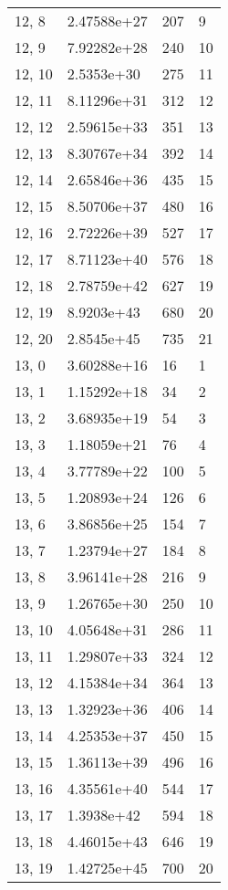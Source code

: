 \begin{table}
\begin{tabular}{llll}
12, 8  &  2.47588e+27 &  207 &     9 \\
12, 9  &  7.92282e+28 &  240 &    10 \\
12, 10 &   2.5353e+30 &  275 &    11 \\
12, 11 &  8.11296e+31 &  312 &    12 \\
12, 12 &  2.59615e+33 &  351 &    13 \\
12, 13 &  8.30767e+34 &  392 &    14 \\
12, 14 &  2.65846e+36 &  435 &    15 \\
12, 15 &  8.50706e+37 &  480 &    16 \\
12, 16 &  2.72226e+39 &  527 &    17 \\
12, 17 &  8.71123e+40 &  576 &    18 \\
12, 18 &  2.78759e+42 &  627 &    19 \\
12, 19 &   8.9203e+43 &  680 &    20 \\
12, 20 &   2.8545e+45 &  735 &    21 \\
13, 0  &  3.60288e+16 &   16 &     1 \\
13, 1  &  1.15292e+18 &   34 &     2 \\
13, 2  &  3.68935e+19 &   54 &     3 \\
13, 3  &  1.18059e+21 &   76 &     4 \\
13, 4  &  3.77789e+22 &  100 &     5 \\
13, 5  &  1.20893e+24 &  126 &     6 \\
13, 6  &  3.86856e+25 &  154 &     7 \\
13, 7  &  1.23794e+27 &  184 &     8 \\
13, 8  &  3.96141e+28 &  216 &     9 \\
13, 9  &  1.26765e+30 &  250 &    10 \\
13, 10 &  4.05648e+31 &  286 &    11 \\
13, 11 &  1.29807e+33 &  324 &    12 \\
13, 12 &  4.15384e+34 &  364 &    13 \\
13, 13 &  1.32923e+36 &  406 &    14 \\
13, 14 &  4.25353e+37 &  450 &    15 \\
13, 15 &  1.36113e+39 &  496 &    16 \\
13, 16 &  4.35561e+40 &  544 &    17 \\
13, 17 &   1.3938e+42 &  594 &    18 \\
13, 18 &  4.46015e+43 &  646 &    19 \\
13, 19 &  1.42725e+45 &  700 &    20 \\

\end{tabular}
\end{table}
